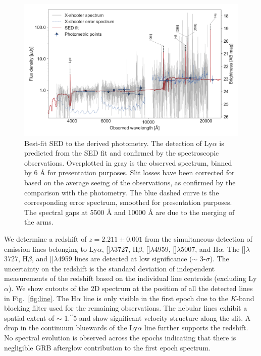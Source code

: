 \documentclass[longauth]{aa}    %
\newcommand{\farc}{\hbox{$.\!\!^{\prime\prime}$}}
\newcommand{\lya}{Ly$\alpha$}
\newcommand{\hb}{H$\beta$}
\newcommand{\ha}{H$\alpha$}
\newcommand{\oii}{[\ion{O}{ii}]}
\newcommand{\oiii}{[\ion{O}{iii}]}
\begin{document}
\begin{figure}
	\centering
	\includegraphics[width=16cm]{figures/SEDspecphot.pdf}
	\caption{Best-fit SED to the derived photometry. The detection of \lya{}  is predicted from the SED fit and confirmed by the spectroscopic observations. Overplotted in gray is the observed spectrum, binned by 6 \AA{} for presentation purposes. Slit losses have been corrected for based on the average seeing of the observations, as confirmed by the comparison with the photometry. The blue dashed curve is the corresponding error spectrum, smoothed for presentation purposes. The spectral gaps at 5500 \AA{} and 10000 \AA{} are due to the merging of the arms.}
	\label{fig:SED}
\end{figure}

We  determine a redshift of $z = 2.211 \pm 0.001$ from the simultaneous detection
of emission lines belonging to \lya, \oii$\lambda$3727, \hb, \oiii$\lambda$4959,
\oiii$\lambda$5007, and \ha. The \oii$\lambda$3727, \hb{}, and \oiii$\lambda$4959
lines are detected at low significance ($\sim$ 3-$\sigma$). The uncertainty on the
redshift is the standard deviation of independent measurements of the redshift
based on the individual line centroids (excluding \lya). We show cutouts of the
2D spectrum at the position of all the detected lines in Fig.~\ref{fig:line}. The 
\ha{} line is only visible in the first epoch due to the $K$-band blocking filter
used for the remaining observations. The nebular lines exhibit a spatial extent
of $\sim$ 1\farc5 and show significant velocity structure along the slit. A drop
in the continuum bluewards of the \lya{} line further supports the redshift. No
spectral evolution is observed across the epochs indicating that there is
negligible GRB afterglow contribution to the first epoch spectrum.
\end{document}
